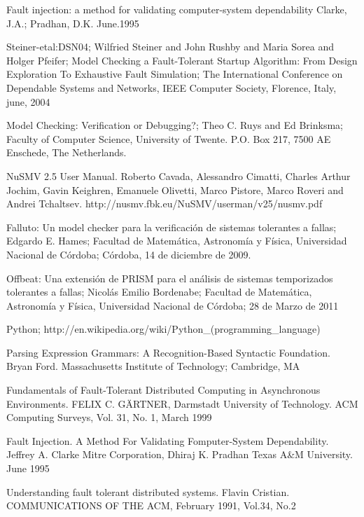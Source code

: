 \documentclass[titlepage, 12pt]{book}
\begin{document}
\begin{thebibliography}{99}

 Fault injection: a method for validating computer-system dependability
Clarke, J.A.; Pradhan, D.K. June.1995 

 Steiner-etal:DSN04; Wilfried Steiner and John Rushby and Maria Sorea and Holger Pfeifer; Model Checking a Fault-Tolerant Startup Algorithm: From Design Exploration To Exhaustive Fault Simulation; The International Conference on Dependable Systems and Networks, IEEE Computer Society, Florence, Italy, june, 2004

 Model Checking: Verification or Debugging?; Theo C. Ruys and Ed Brinksma; Faculty of Computer Science, University of Twente. P.O. Box 217, 7500 AE Enschede, The Netherlands.

 NuSMV 2.5 User Manual. Roberto Cavada, Alessandro Cimatti, Charles Arthur Jochim, Gavin Keighren,
Emanuele Olivetti, Marco Pistore, Marco Roveri and Andrei Tchaltsev. http://nusmv.fbk.eu/NuSMV/userman/v25/nusmv.pdf

 Falluto: Un model checker para la verificaci\'on de sistemas tolerantes a fallas; Edgardo E. Hames; Facultad de Matem\'atica, Astronom\'ia y F\'isica, Universidad Nacional de C\'ordoba; C\'ordoba, 14 de diciembre de 2009.

 Offbeat: Una extensi\'on de PRISM para el an\'alisis de sistemas temporizados tolerantes a fallas; Nicol\'as Emilio Bordenabe; Facultad de Matem\'atica, Astronom\'ia y F\'isica, Universidad Nacional de C\'ordoba; 28 de Marzo de 2011

 Python; http://en.wikipedia.org/wiki/Python\_(programming\_language)

 Parsing Expression Grammars: A Recognition-Based Syntactic Foundation. Bryan Ford. Massachusetts Institute of Technology; Cambridge, MA

 Fundamentals of Fault-Tolerant Distributed Computing in Asynchronous Environments. FELIX C. GÄRTNER,
Darmstadt University of Technology. ACM Computing Surveys, Vol. 31, No. 1, March 1999

 Fault Injection. A Method For Validating Fomputer-System Dependability. Jeffrey A. Clarke Mitre Corporation, Dhiraj K. Pradhan Texas A\&M University. June 1995

 Understanding fault tolerant distributed systems. Flavin Cristian. COMMUNICATIONS OF THE ACM, February 1991, Vol.34, No.2


\end{thebibliography}
\end{document}
